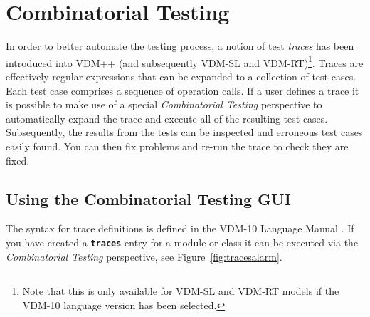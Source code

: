\documentclass{overturerepchap}
\begin{document}

\chapter{Combinatorial Testing}\label{sec:testing}

In order to better automate the testing process, a notion of
test \emph{traces} has been introduced into VDM++ (and subsequently VDM-SL and VDM-RT)\footnote{Note that this is
only available for VDM-SL and VDM-RT models if the VDM-10 language version has been selected.}.
Traces are effectively regular expressions that can be expanded to a collection of test
cases. Each test case comprises a sequence of operation
calls. If a user defines a trace it is possible to make use of a
special \emph{Combinatorial Testing} perspective to automatically
expand the trace and execute all of the resulting test
cases. Subsequently, the results from the tests can be inspected
and erroneous test cases easily found. You can then fix
problems and re-run the trace to check they are fixed.

\section{Using the Combinatorial Testing GUI}

The syntax for trace definitions is defined in the VDM-10 Language
Manual \cite{Larsen&10b}.
If you have created a {\textbf\texttt{traces}} entry for a module or class it
can be executed via the \emph{Combinatorial Testing}
perspective, see
Figure~\ref{fig:tracesalarm}.
\end{document}
